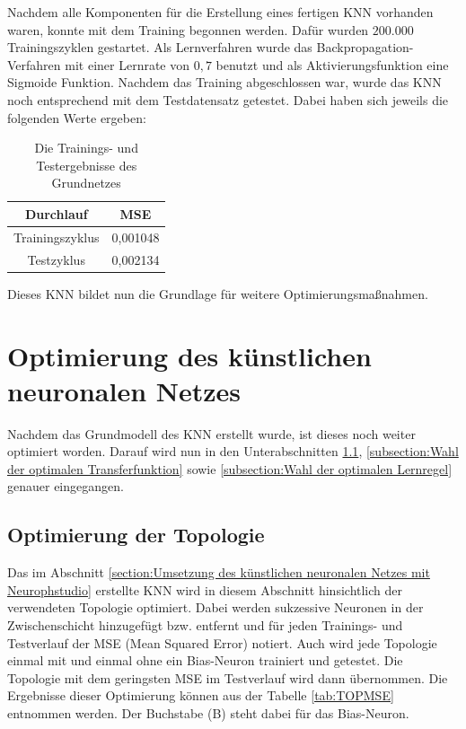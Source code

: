 Nachdem alle Komponenten für die Erstellung eines fertigen KNN vorhanden waren, konnte mit dem Training begonnen werden. Dafür wurden $200.000$ Trainingszyklen gestartet. Als Lernverfahren wurde das Backpropagation-Verfahren mit einer Lernrate von $0,7$ benutzt und als Aktivierungsfunktion eine Sigmoide Funktion. Nachdem das Training abgeschlossen war, wurde das KNN noch entsprechend mit dem Testdatensatz getestet. Dabei haben sich jeweils die folgenden Werte ergeben:

\begin{table}[H]
\centering
\begin{tabular}{|c|c|}
\hline 
\textbf{Durchlauf} & \textbf{MSE} \\ 
\hline 
Trainingszyklus & 0,001048 \\ 
\hline  
Testzyklus & 0,002134  \\ 
\hline 
\end{tabular} 
\label{tab:ERGGrundnetz}
\caption{Die Trainings- und Testergebnisse des Grundnetzes}
\end{table}

Dieses KNN bildet nun die Grundlage für weitere Optimierungsmaßnahmen.

\section{Optimierung des künstlichen neuronalen Netzes}
\label{section:Optimierung des künstlischen neuronalen Netzes}

Nachdem das Grundmodell des KNN erstellt wurde, ist dieses noch weiter optimiert worden. Darauf wird nun in den Unterabschnitten \ref{subsection:Optimierung der Topologie}, \ref{subsection:Wahl der optimalen Transferfunktion} sowie \ref{subsection:Wahl der optimalen Lernregel} genauer eingegangen. 

\subsection{Optimierung der Topologie}
\label{subsection:Optimierung der Topologie}

Das im Abschnitt \ref{section:Umsetzung des künstlichen neuronalen Netzes mit Neurophstudio} erstellte KNN wird in diesem Abschnitt hinsichtlich der verwendeten Topologie optimiert. Dabei werden sukzessive Neuronen in der Zwischenschicht hinzugefügt bzw. entfernt und für jeden Trainings- und Testverlauf der MSE (Mean Squared Error) notiert. Auch wird jede Topologie einmal mit und einmal ohne ein Bias-Neuron trainiert und getestet. Die Topologie mit dem geringsten MSE im Testverlauf wird dann übernommen. Die Ergebnisse dieser Optimierung können aus der Tabelle \ref{tab:TOPMSE} entnommen werden. Der Buchstabe (B) steht dabei für das Bias-Neuron.

